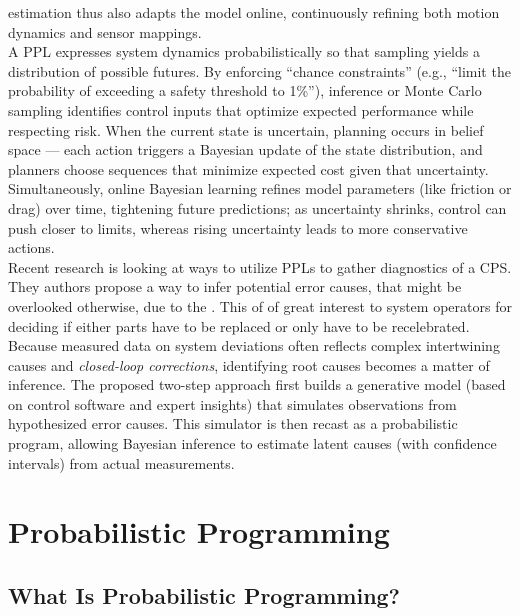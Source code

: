 \documentclass[11pt]{report}
\begin{document}
\begin{multicols}{2}
estimation thus also adapts the model online, continuously refining both motion dynamics and sensor mappings.
\\
A PPL expresses system dynamics probabilistically so that sampling yields a distribution of possible futures. \cite{cpsPredictiveControl} By enforcing “chance constraints” 
(e.g., “limit the probability of exceeding a safety threshold to 1\%”), inference or Monte Carlo sampling identifies control inputs that optimize expected performance while 
respecting risk. When the current state is uncertain, planning occurs in belief space — each action triggers a Bayesian update of the state distribution, and planners 
choose sequences that minimize expected cost given that uncertainty. Simultaneously, online Bayesian learning refines model parameters (like friction or drag) over time, 
tightening future predictions; as uncertainty shrinks, control can push closer to limits, whereas rising uncertainty leads to more conservative actions.
\\
Recent research is looking at ways to utilize PPLs to gather diagnostics of a CPS. \cite{cpsPPLDiagnostics} They authors propose a way to infer potential error causes, that
might be overlooked otherwise, due to the . 
This of of great interest to system operators for deciding if either parts have to be replaced or only have to be recelebrated. Because measured data on system deviations
often reflects complex intertwining causes and \textit{closed-loop corrections}, identifying root causes becomes a matter of inference. The proposed two-step approach 
first builds a generative model (based on control software and expert insights) that simulates observations from hypothesized error causes. This simulator is then recast 
as a probabilistic program, allowing Bayesian inference to estimate latent causes (with confidence intervals) from actual measurements.

\end{multicols}

\chapter{Probabilistic Programming}
\section{What Is Probabilistic Programming?}
\end{document}
